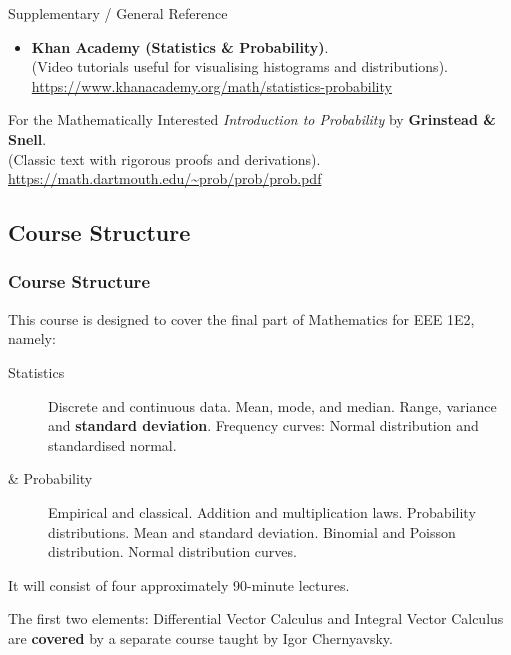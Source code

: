 \begin{frame}[allowframebreaks]
\begin{block}{Supplementary / General Reference}
\begin{itemize}
    \item \textbf{Khan Academy (Statistics \& Probability)}. \\
    (Video tutorials useful for visualising histograms and distributions). \\
    \url{https://www.khanacademy.org/math/statistics-probability}
\end{itemize}
\end{block}

\begin{block}{For the Mathematically Interested}
    \emph{Introduction to Probability} by \textbf{Grinstead \& Snell}. \\
    (Classic text with rigorous proofs and derivations). \\
    \url{https://math.dartmouth.edu/~prob/prob/prob.pdf}
\end{block}
\end{frame}

\subsection{Course Structure}
\begin{frame}[label=CourseStructure]
\frametitle{Course Structure}
This course is designed to cover the final part of Mathematics for EEE 1E2, namely:

\begin{description}
    \item[Statistics] Discrete and continuous data. Mean, mode, and median. Range, variance and \textbf{standard deviation}. Frequency curves: Normal distribution and standardised normal.
    \item[\& Probability] Empirical and classical. Addition and multiplication laws. Probability distributions. Mean and standard deviation. Binomial and Poisson distribution. Normal distribution curves.
\end{description}

It will consist of four approximately 90-minute lectures.


The first two elements: Differential Vector Calculus and Integral Vector Calculus are \textbf{covered} by a separate course taught by \alert{Igor Chernyavsky}.
\end{frame}

